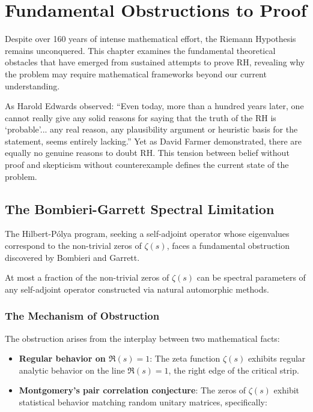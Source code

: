 \chapter{Fundamental Obstructions to Proof}
\label{ch:obstructions}

Despite over 160 years of intense mathematical effort, the Riemann Hypothesis remains unconquered. This chapter examines the fundamental theoretical obstacles that have emerged from sustained attempts to prove RH, revealing why the problem may require mathematical frameworks beyond our current understanding.

As Harold Edwards observed: ``Even today, more than a hundred years later, one cannot really give any solid reasons for saying that the truth of the RH is `probable'... any real reason, any plausibility argument or heuristic basis for the statement, seems entirely lacking.'' Yet as David Farmer demonstrated, there are equally no genuine reasons to doubt RH. This tension between belief without proof and skepticism without counterexample defines the current state of the problem.

\section{The Bombieri-Garrett Spectral Limitation}
\label{sec:bombieri_garrett}

The Hilbert-P\'olya program, seeking a self-adjoint operator whose eigenvalues correspond to the non-trivial zeros of $\zeta(s)$, faces a fundamental obstruction discovered by Bombieri and Garrett.

\begin{theorem}
\label{thm:bombieri_garrett}
At most a fraction of the non-trivial zeros of $\zeta(s)$ can be spectral parameters of any self-adjoint operator constructed via natural automorphic methods.
\end{theorem}

\subsection{The Mechanism of Obstruction}

The obstruction arises from the interplay between two mathematical facts:

\begin{itemize}
\item \textbf{Regular behavior on $\Re(s) = 1$}: The zeta function $\zeta(s)$ exhibits regular analytic behavior on the line $\Re(s) = 1$, the right edge of the critical strip.
\item \textbf{Montgomery's pair correlation conjecture}: The zeros of $\zeta(s)$ exhibit statistical behavior matching random unitary matrices, specifically:
\end{itemize}

